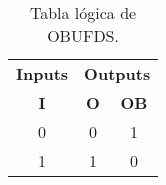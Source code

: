                 \begin{table}[htbp]
                    \centering
                    \caption{Tabla lógica de OBUFDS.}
                    \begin{tabular}{|c|cc|}
                        \hline
                        \textbf{Inputs} & \multicolumn{2}{c|}{\textbf{Outputs}} \\ 
                        \textbf{I}      & \multicolumn{1}{c}{\textbf{O}}  & \textbf{OB} \\ 
                        \hline
                        0      & \multicolumn{1}{c|}{0}  & 1  \\ \hline
                        1      & \multicolumn{1}{c|}{1}  & 0  \\ \hline
                    \end{tabular}
                    \label{tab:obufds}
                \end{table}

                \vspace{0.4cm}
                

	\begin{comment}

	
\begin{table}[htbp]
  \centering
  \caption{Resumen de los resultados de implementación de las TRNGs}
\resizebox{0.5\linewidth}{!}{ 
    \begin{tabular}{lll}
   & Test name                 & Prop. \\
   \hline
1  & Frequency                 & 0.99  \\
2  & Block frequency           & 0.99  \\
3  & Runs                      & 1.00     \\
4  & Longest run               & 1.0     \\
5  & Rank                      & 0.98  \\
6  & DFT                       & 0.99  \\
7  & Non-overlapping templates & 1.00     \\
8  & Overlapping templates     & 0.99  \\
9  & Universal                 & 0.99  \\
10 & Linear complexity         & 0.99  \\
11 & Serial                    & 0.99  \\
12 & Approximate Entropy       & 0.99  \\
13 & Cumulative Sums           & 0.99  \\
14 & Random excursions         & 0.99  \\
15 & Random excursions variant & 1.00    
    \end{tabular}
}
  \label{tab:asdasd}
\end{table}


\newpage
	




	\end{comment}

